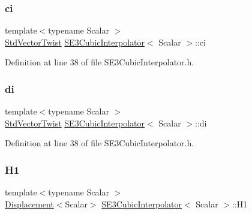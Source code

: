 \subsubsection{\texorpdfstring{ci}{ci}}
{\footnotesize\ttfamily template$<$typename Scalar $>$ \\
\hyperlink{class_s_e3_cubic_interpolator_ae70acde9b57ec38aaf1eaeee50bb35c5}{Std\+Vector\+Twist} \hyperlink{class_s_e3_cubic_interpolator}{S\+E3\+Cubic\+Interpolator}$<$ Scalar $>$\+::ci\hspace{0.3cm}{\ttfamily [protected]}}



Definition at line 38 of file S\+E3\+Cubic\+Interpolator.\+h.

\hypertarget{class_s_e3_cubic_interpolator_ac2edcd8d93807db3f241d49390a2e3dc}{}\label{class_s_e3_cubic_interpolator_ac2edcd8d93807db3f241d49390a2e3dc} 
\subsubsection{\texorpdfstring{di}{di}}
{\footnotesize\ttfamily template$<$typename Scalar $>$ \\
\hyperlink{class_s_e3_cubic_interpolator_ae70acde9b57ec38aaf1eaeee50bb35c5}{Std\+Vector\+Twist} \hyperlink{class_s_e3_cubic_interpolator}{S\+E3\+Cubic\+Interpolator}$<$ Scalar $>$\+::di\hspace{0.3cm}{\ttfamily [protected]}}



Definition at line 38 of file S\+E3\+Cubic\+Interpolator.\+h.

\hypertarget{class_s_e3_cubic_interpolator_a57ac720f2b715a74d29472dc9ba4e6f5}{}\label{class_s_e3_cubic_interpolator_a57ac720f2b715a74d29472dc9ba4e6f5} 
\subsubsection{\texorpdfstring{H1}{H1}}
{\footnotesize\ttfamily template$<$typename Scalar $>$ \\
\hyperlink{class_displacement}{Displacement}$<$Scalar$>$ \hyperlink{class_s_e3_cubic_interpolator}{S\+E3\+Cubic\+Interpolator}$<$ Scalar $>$\+::H1\hspace{0.3cm}{\ttfamily [protected]}}



